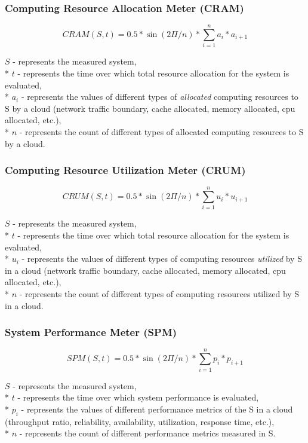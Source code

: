 \documentclass{uvamscse}
\begin{document}
\subsubsection{Computing Resource Allocation Meter (CRAM)}
\begin{center}
  $$CRAM(S,t) = 0.5 * \sin(2\Pi/n) * \sum_{i=1}^{n}a_i*a_{i+1}$$
\end{center}
  \texttt{$S$} - represents the measured system, \\*
  \texttt{$t$} - represents the time over which total resource allocation for the system is evaluated, \\*
  \texttt{$a_i$} - represents the values of different types of \textit{allocated} computing resources to S by a cloud (network traffic boundary, cache allocated, memory allocated, cpu allocated, etc.), \\*
  \texttt{$n$} - represents the count of different types of allocated computing resources to S by a cloud.

\subsubsection{Computing Resource Utilization Meter (CRUM)}
\begin{center}
  $$CRUM(S,t) = 0.5 * \sin(2\Pi/n) * \sum_{i=1}^{n}u_i*u_{i+1}$$
\end{center}
  \texttt{$S$} - represents the measured system, \\*
  \texttt{$t$} - represents the time over which total resource allocation for the system is evaluated, \\*
  \texttt{$u_i$} - represents the values of different types of computing resources \textit{utilized} by S in a cloud (network traffic boundary, cache allocated, memory allocated, cpu allocated, etc.), \\*
  \texttt{$n$} - represents the count of different types of computing resources utilized by S in a cloud.

\subsubsection{System Performance Meter (SPM)}
\begin{center}
  $$SPM(S,t) = 0.5 * \sin(2\Pi/n) * \sum_{i=1}^{n}p_i*p_{i+1}$$
\end{center}
  \texttt{$S$} - represents the measured system, \\*
  \texttt{$t$} - represents the time over which system performance is evaluated, \\*
  \texttt{$p_i$} - represents the values of different performance metrics of the S in a cloud  (throughput ratio, reliability, availability, utilization, response time, etc.), \\*
  \texttt{$n$} - represents the count of different performance metrics measured in S.
\end{document}
